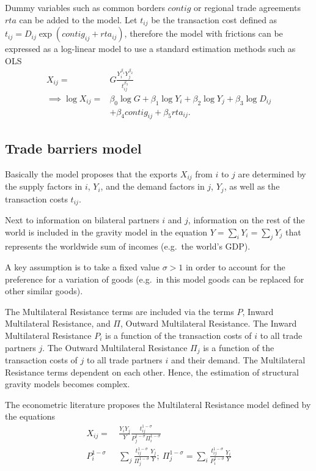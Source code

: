 \documentclass[12pt,reqno,oneside,pdftex]{formato-puc/puctesis} %
\begin{document}
Dummy variables such as common borders \(contig\) or regional trade
agreements \(rta\) can be added to the model. Let \(t_{ij}\) be the
transaction cost defined as
\(t_{ij}= D_{ij} \exp(contig_{ij} + rta_{ij})\), therefore the model
with frictions can be expressed as a log-linear model to use a standard
estimation methods such as OLS \begin{align}
X_{ij} =& G\frac{Y_{i}^{\beta_{1}}Y_{j}^{\beta_{2}}}{t_{ij}^{\beta_{3}}} \\
\implies \log X_{ij} =& \beta_{0}\log G +\beta_{1}\log Y_{i}+\beta_{2}\log Y_{j}+\beta_{3}\log D_{ij}\\
&+ \beta_{4}contig_{ij}+\beta_{5}rta_{ij}.
\end{align}

\hypertarget{trade-barriers-model}{%
\subsection{Trade barriers model}\label{trade-barriers-model}}

Basically the model proposes that the exports \(X_{ij}\) from \(i\) to
\(j\) are determined by the supply factors in \(i\), \(Y_{i}\), and the
demand factors in \(j\), \(Y_{j}\), as well as the transaction costs
\(t_{ij}\).

Next to information on bilateral partners \(i\) and \(j\), information
on the rest of the world is included in the gravity model in the
equation \(Y=\sum_{i} Y_{i}= \sum_{j} Y_{j}\) that represents the
worldwide sum of incomes (e.g.~the world's GDP).

A key assumption is to take a fixed value \(\sigma > 1\) in order to
account for the preference for a variation of goods (e.g.~in this model
goods can be replaced for other similar goods).

The Multilateral Resistance terms are included via the terms \(P\),
Inward Multilateral Resistance, and \(\Pi\), Outward Multilateral
Resistance. The Inward Multilateral Resistance \(P_i\) is a function of
the transaction costs of \(i\) to all trade partners \(j\). The Outward
Multilateral Resistance \(\Pi_{j}\) is a function of the transaction
costs of \(j\) to all trade partners \(i\) and their demand. The
Multilateral Resistance terms dependent on each other. Hence, the
estimation of structural gravity models becomes complex.

The econometric literature proposes the Multilateral Resistance model
defined by the equations \begin{align}
X_{ij} =& \frac{Y_{i}Y_{j}}{Y}\frac{t_{ij}^{1-\sigma}}{P_{j}^{1-\sigma}\Pi_{i}^{1-\sigma}}\\
P_{i}^{1-\sigma} \text{ }& \sum_{j}\frac{t_{ij}^{1-\sigma}}{\Pi_{j}^{1-\sigma}}\frac{Y_{j}}{Y};\:\Pi_{j}^{1-\sigma}=\sum_{i}\frac{t_{ij}^{1-\sigma}}{P_{i}^{1-\sigma}}\frac{Y_{i}}{Y}
\end{align}
\end{document}
